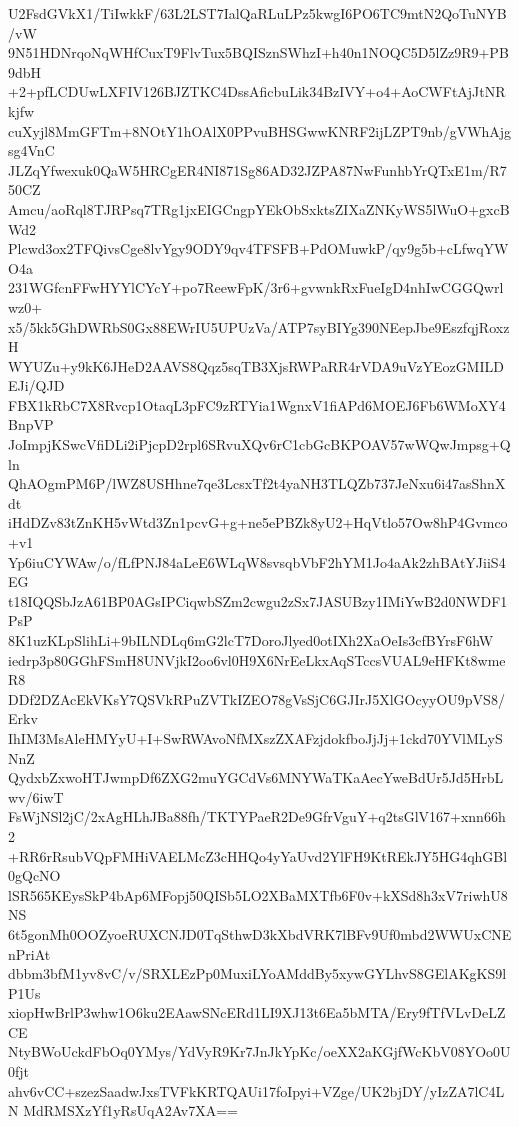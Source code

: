 U2FsdGVkX1/TiIwkkF/63L2LST7IalQaRLuLPz5kwgI6PO6TC9mtN2QoTuNYB/vW
9N51HDNrqoNqWHfCuxT9FlvTux5BQISznSWhzI+h40n1NOQC5D5lZz9R9+PB9dbH
+2+pfLCDUwLXFIV126BJZTKC4DssAficbuLik34BzIVY+o4+AoCWFtAjJtNRkjfw
cuXyjl8MmGFTm+8NOtY1hOAlX0PPvuBHSGwwKNRF2ijLZPT9nb/gVWhAjgsg4VnC
JLZqYfwexuk0QaW5HRCgER4NI871Sg86AD32JZPA87NwFunhbYrQTxE1m/R750CZ
Amcu/aoRql8TJRPsq7TRg1jxEIGCngpYEkObSxktsZIXaZNKyWS5lWuO+gxcBWd2
Plcwd3ox2TFQivsCge8lvYgy9ODY9qv4TFSFB+PdOMuwkP/qy9g5b+cLfwqYWO4a
231WGfcnFFwHYYlCYcY+po7ReewFpK/3r6+gvwnkRxFueIgD4nhIwCGGQwrlwz0+
x5/5kk5GhDWRbS0Gx88EWrIU5UPUzVa/ATP7syBIYg390NEepJbe9EszfqjRoxzH
WYUZu+y9kK6JHeD2AAVS8Qqz5sqTB3XjsRWPaRR4rVDA9uVzYEozGMILDEJi/QJD
FBX1kRbC7X8Rvcp1OtaqL3pFC9zRTYia1WgnxV1fiAPd6MOEJ6Fb6WMoXY4BnpVP
JoImpjKSwcVfiDLi2iPjcpD2rpl6SRvuXQv6rC1cbGcBKPOAV57wWQwJmpsg+Qln
QhAOgmPM6P/lWZ8USHhne7qe3LcsxTf2t4yaNH3TLQZb737JeNxu6i47asShnXdt
iHdDZv83tZnKH5vWtd3Zn1pcvG+g+ne5ePBZk8yU2+HqVtlo57Ow8hP4Gvmco+v1
Yp6iuCYWAw/o/fLfPNJ84aLeE6WLqW8svsqbVbF2hYM1Jo4aAk2zhBAtYJiiS4EG
t18IQQSbJzA61BP0AGsIPCiqwbSZm2cwgu2zSx7JASUBzy1IMiYwB2d0NWDF1PsP
8K1uzKLpSlihLi+9bILNDLq6mG2lcT7DoroJlyed0otIXh2XaOeIs3cfBYrsF6hW
iedrp3p80GGhFSmH8UNVjkI2oo6vl0H9X6NrEeLkxAqSTccsVUAL9eHFKt8wmeR8
DDf2DZAcEkVKsY7QSVkRPuZVTkIZEO78gVsSjC6GJIrJ5XlGOcyyOU9pVS8/Erkv
IhIM3MsAleHMYyU+I+SwRWAvoNfMXszZXAFzjdokfboJjJj+1ckd70YVlMLySNnZ
QydxbZxwoHTJwmpDf6ZXG2muYGCdVs6MNYWaTKaAecYweBdUr5Jd5HrbLwv/6iwT
FsWjNSl2jC/2xAgHLhJBa88fh/TKTYPaeR2De9GfrVguY+q2tsGlV167+xnn66h2
+RR6rRsubVQpFMHiVAELMcZ3cHHQo4yYaUvd2YlFH9KtREkJY5HG4qhGBl0gQcNO
lSR565KEysSkP4bAp6MFopj50QISb5LO2XBaMXTfb6F0v+kXSd8h3xV7riwhU8NS
6t5gonMh0OOZyoeRUXCNJD0TqSthwD3kXbdVRK7lBFv9Uf0mbd2WWUxCNEnPriAt
dbbm3bfM1yv8vC/v/SRXLEzPp0MuxiLYoAMddBy5xywGYLhvS8GElAKgKS9lP1Us
xiopHwBrlP3whw1O6ku2EAawSNcERd1LI9XJ13t6Ea5bMTA/Ery9fTfVLvDeLZCE
NtyBWoUckdFbOq0YMys/YdVyR9Kr7JnJkYpKc/oeXX2aKGjfWcKbV08YOo0U0fjt
ahv6vCC+szezSaadwJxsTVFkKRTQAUi17foIpyi+VZge/UK2bjDY/yIzZA7lC4LN
MdRMSXzYf1yRsUqA2Av7XA==
